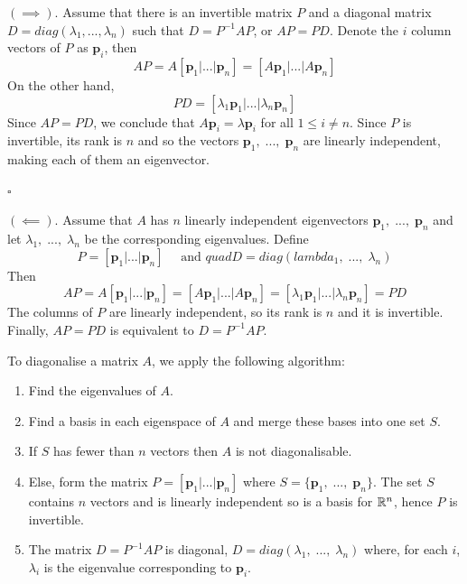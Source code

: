 \newpage\noindent{}
{\((\implies).\) Assume that there is an invertible matrix \(P\) and a diagonal matrix \(D = diag(\lambda_1,...,\lambda_n)\) such that \(D=P^{-1}AP\), or \(AP=PD\). Denote the \(i\) column vectors of \(P\) as \(\mathbf{p}_i\), then
\begin{equation}
    AP = A[\mathbf{p}_1|...|\mathbf{p}_n] = [A\mathbf{p}_1|...|A\mathbf{p}_n]
\end{equation}
On the other hand, 
\begin{equation}
    PD = [\lambda_1\mathbf{p}_1|...|\lambda_n\mathbf{p}_n]
\end{equation}
Since \(AP=PD\), we conclude that \(A\mathbf{p}_i = \lambda\mathbf{p}_i\) for all \(1 \leq i \neq n\). Since \(P\) is invertible, its rank is \(n\) and so the vectors \(\mathbf{p}_1,\;...,\;\mathbf{p}_n\) are linearly independent, making each of them an eigenvector.\begin{flushright}\(\square\)\end{flushright}

\((\impliedby).\) Assume that \(A\) has \(n\) linearly independent eigenvectors \(\mathbf{p}_1,\;...,\;\mathbf{p}_n\) and let \(\lambda_1,\;...,\;\lambda_n\) be the corresponding eigenvalues. Define
\begin{equation}
    P = [\mathbf{p}_1|...|\mathbf{p}_n] \quad\text{ and }quad D = diag(lambda_1,\;...,\;\lambda_n)
\end{equation}
Then
\begin{equation}
    AP = A[\mathbf{p}_1|...|\mathbf{p}_n] = [A\mathbf{p}_1|...|A\mathbf{p}_n] = [\lambda_1\mathbf{p}_1|...|\lambda_n\mathbf{p}_n] = PD
\end{equation}
The columns of \(P\) are linearly independent, so its rank is \(n\) and it is invertible. Finally, \(AP=PD\) is equivalent to \(D=P^{-1}AP\).}

To diagonalise a matrix \(A\), we apply the following algorithm:
\begin{enumerate}
    \item Find the eigenvalues of \(A\).
    \item Find a basis in each eigenspace of \(A\) and merge these bases into one set \(S\).
    \item If \(S\) has fewer than \(n\) vectors then \(A\) is not diagonalisable.
    \item Else, form the matrix \(P = [\mathbf{p}_1|...|\mathbf{p}_n]\) where \(S = \{\mathbf{p}_1,\;...,\;\mathbf{p}_n\}\). The set \(S\) contains \(n\) vectors and is linearly independent so is a basis for \(\mathbb{R}^n\), hence \(P\) is invertible.
    \item The matrix \(D=P^{-1}AP\) is diagonal, \(D=diag(\lambda_1,\;...,\;\lambda_n)\) where, for each \(i\), \(\lambda_i\) is the eigenvalue corresponding to \(\mathbf{p}_i\).
\end{enumerate}

